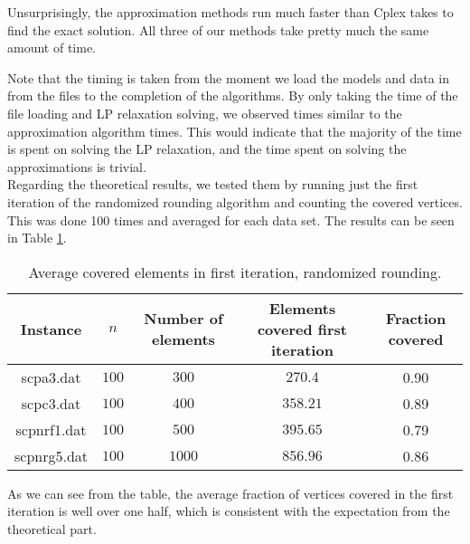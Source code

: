 \documentclass[11pt,a4paper,english]{article}
\begin{document}
 Unsurprisingly, the approximation methods run much faster than Cplex takes to find the exact solution. All three of our methods take pretty much the same amount of time.

 Note that the timing is taken from the moment we load the models and data in from the files to the completion of the algorithms. By only taking the time of the file loading and LP relaxation solving, we observed times similar to the approximation algorithm times. This would indicate that the majority of the time is spent on solving the LP relaxation, and the time spent on solving the approximations is trivial.\\

Regarding the theoretical results, we tested them by running just the first iteration of the randomized rounding algorithm and counting the covered vertices. This was done 100 times and averaged for each data set. The results can be seen in Table \ref{tab:rand}.

\begin{table}[h!]
  \centering
  \begin{tabular}{|c|c|c|c|c|}\hline
    Instance& $n$ & Number of elements & Elements covered first iteration & Fraction covered\\\hline
    scpa3.dat &$100$    & $300$ & $270.4$ & 0.90 \\
    scpc3.dat &$100$    & $400$ & $358.21$ & 0.89\\
    scpnrf1.dat	 &$100$ & $500$ & $395.65$ & 0.79 \\
    scpnrg5.dat &$100$  & $1000$ & $856.96$ & 0.86 \\\hline
  \end{tabular}
  \caption{Average covered elements in first iteration, randomized rounding.}
  \label{tab:rand}
\end{table}

As we can see from the table, the average fraction of vertices covered in the first iteration is well over one half, which is consistent with the expectation from the theoretical part.

\clearpage


\end{document}
